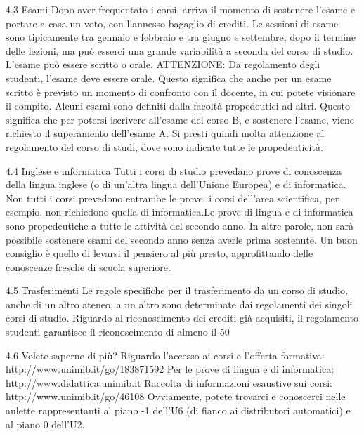 4.3 Esami 
Dopo aver frequentato i corsi, arriva il momento di sostenere l'esame e portare a casa un voto, con l'annesso bagaglio di crediti. Le sessioni di esame sono tipicamente tra gennaio e febbraio e tra giugno e settembre, dopo il termine delle lezioni, ma può esserci una grande variabilità a seconda del corso di studio. L'esame può essere scritto o orale. 
ATTENZIONE: Da regolamento degli studenti, l'esame deve essere orale. Questo significa che anche per un esame scritto è previsto un momento di confronto con il docente, in cui potete visionare il compito. 
Alcuni esami sono definiti dalla facoltà propedeutici ad altri. Questo significa che per potersi iscrivere all'esame del corso B, e sostenere l'esame, viene richiesto il superamento dell'esame A. Si presti quindi molta attenzione al regolamento del corso di studi, dove sono indicate tutte le propedeuticità.

4.4 Inglese e informatica 
Tutti i corsi di studio prevedano prove di conoscenza della lingua inglese (o di un'altra lingua dell'Unione Europea) e di informatica. Non tutti i corsi prevedono entrambe le prove: i corsi dell'area scientifica, per esempio, non richiedono quella di informatica.Le prove di lingua e di informatica sono propedeutiche a tutte le attività del secondo anno. In altre parole, non sarà possibile sostenere esami del secondo anno senza averle prima sostenute. Un buon consiglio è quello di levarsi il pensiero al più presto, approfittando delle conoscenze fresche di scuola superiore. 

4.5 Trasferimenti 
Le regole specifiche per il trasferimento da un corso di studio, anche di un altro ateneo, a un altro sono determinate dai regolamenti dei singoli corsi di studio. Riguardo al riconoscimento dei crediti già acquisiti, il regolamento studenti garantisce il riconoscimento di almeno il 50%

4.6 Volete saperne di più? 
Riguardo l'accesso ai corsi e l'offerta formativa: http://www.unimib.it/go/183871592 
Per le prove di lingua e di informatica: http://www.didattica.unimib.it 
Raccolta di informazioni esaustive sui corsi: http://www.unimib.it/go/46108 
Ovviamente, potete trovarci e conoscerci nelle aulette rappresentanti al piano -1 dell'U6 (di fianco ai distributori automatici) e al piano 0 dell'U2. 

